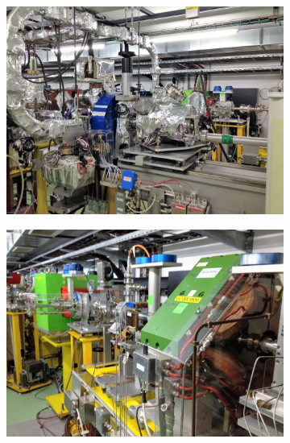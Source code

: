 \begin{figure}[tph]
    \begin{subfigure}{0.47\linewidth}
		\centering
		\includegraphics[width=\linewidth]{images/CLIC-CTF3-img1}
    \end{subfigure}        
	\hfill
    \begin{subfigure}{0.47\linewidth}
		\centering
		\includegraphics[width=\linewidth]{images/CLIC-CTF3-img2}
    \end{subfigure}
	\par\bigskip
    \begin{subfigure}{0.47\linewidth}
		\centering

\end{subfigure}
\end{figure}
